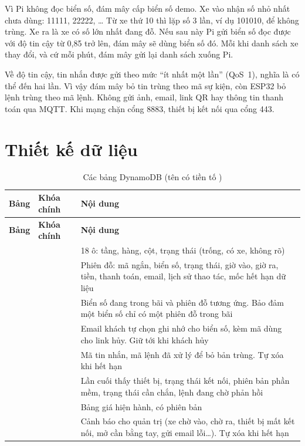 Vì Pi không đọc biển số, đám mây cấp biển số demo. Xe vào nhận số nhỏ nhất chưa dùng: 11111, 22222, \ldots{} Từ xe thứ 10 thì lặp số 3 lần, ví dụ 101010, để không trùng. Xe ra là xe có số lớn nhất đang đỗ. Nếu sau này Pi gửi biển số đọc được với độ tin cậy từ 0,85 trở lên, đám mây sẽ dùng biển số đó. Mỗi khi danh sách xe thay đổi, và cứ mỗi phút, đám mây gửi lại danh sách xuống Pi.

Về độ tin cậy, tin nhắn được gửi theo mức ``ít nhất một lần'' (QoS~1), nghĩa là có thể đến hai lần. Vì vậy đám mây bỏ tin trùng theo mã sự kiện, còn ESP32 bỏ lệnh trùng theo mã lệnh. Không gửi ảnh, email, link QR hay thông tin thanh toán qua MQTT. Khi mạng chặn cổng 8883, thiết bị kết nối qua cổng 443.

\section{Thiết kế dữ liệu}

\begin{longtable}{@{}P{3cm}P{3cm}P{8.1cm}@{}}
\caption{Các bảng DynamoDB (tên có tiền tố )}\label{tab:bang}\\
\toprule
\textbf{Bảng} & \textbf{Khóa chính} & \textbf{Nội dung} \\ \midrule
\endfirsthead
\toprule
\textbf{Bảng} & \textbf{Khóa chính} & \textbf{Nội dung} \\ \midrule
\endhead
{} &  & 18 ô: tầng, hàng, cột, trạng thái (trống, có xe, không rõ) \\
 &  & Phiên đỗ: mã ngắn, biển số, trạng thái, giờ vào, giờ ra, tiền, thanh toán, email, lịch sử thao tác, mốc hết hạn dữ liệu \\
 &  & Biển số đang trong bãi và phiên đỗ tương ứng. Bảo đảm một biển số chỉ có một phiên đỗ trong bãi \\
 &  & Email khách tự chọn ghi nhớ cho biển số, kèm mã dùng cho link hủy. Giữ tới khi khách hủy \\
 &  & Mã tin nhắn, mã lệnh đã xử lý để bỏ bản trùng. Tự xóa khi hết hạn \\
 &  & Lần cuối thấy thiết bị, trạng thái kết nối, phiên bản phần mềm, trạng thái cần chắn, lệnh đang chờ phản hồi \\
 &  & Bảng giá hiện hành, có phiên bản \\
 &  & Cảnh báo cho quản trị (xe chờ vào, chờ ra, thiết bị mất kết nối, mở cần bằng tay, gửi email lỗi\ldots). Tự xóa khi hết hạn \\
\bottomrule
\end{longtable}

